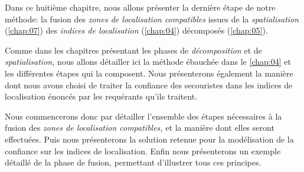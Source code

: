Dans ce huitième chapitre, nous allons présenter la dernière étape de
notre méthode: la fusion des \emph{zones de localisation compatibles}
issues de la \emph{spatialisation} (\autoref{chap:07}) des
\emph{indices de localisation} (\autoref{chap:04}) décomposés
(\autoref{chap:05}).

Comme dans les chapitres présentant les phases de \emph{décomposition}
et de \emph{spatialisation,} nous allons détailler ici la méthode
ébauchée dans le \autoref{chap:04} et les différentes étapes qui la
composent. Nous présenterons également la manière dont nous avons
choisi de traiter la confiance des secouristes dans les indices de
localisation énoncés par les requérants qu'ils traitent.

Nous commencerons donc par détailler l'ensemble des étapes nécessaires
à la fusion des \emph{zones de localisation compatibles,} et la
manière dont elles seront effectuées. Puis nous présenterons la
solution retenue pour la modélisation de la confiance sur les indices
de localisation. Enfin nous présenterons un exemple détaillé de la
phase de fusion, permettant d'illustrer tous ces principes.

